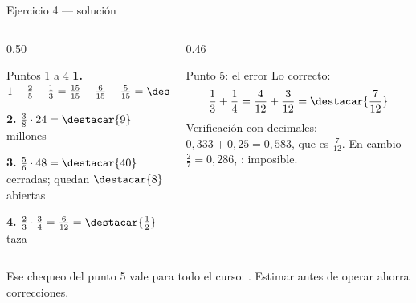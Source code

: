 \documentclass[aspectratio=169,10pt]{beamer}
\begin{document}
\begin{frame}{Ejercicio 4 — solución}
  \scriptsize
  \begin{columns}[T,onlytextwidth]
    \begin{column}{0.50\textwidth}
      \begin{block}{Puntos 1 a 4}
        \tiny
        \textbf{1.} $1 - \tfrac{2}{5} - \tfrac{1}{3}
        = \tfrac{15}{15}-\tfrac{6}{15}-\tfrac{5}{15}
        = \destacar{\tfrac{4}{15}}$

        \vspace{0.08cm}
        \textbf{2.} $\tfrac{3}{8}\cdot 24 = \destacar{9}$ millones

        \vspace{0.08cm}
        \textbf{3.} $\tfrac{5}{6}\cdot 48 = \destacar{40}$ cerradas;
        quedan $\destacar{8}$ abiertas

        \vspace{0.08cm}
        \textbf{4.} $\tfrac{2}{3}\cdot\tfrac{3}{4} = \tfrac{6}{12}
        = \destacar{\tfrac{1}{2}}$ taza
      \end{block}
    \end{column}
    \begin{column}{0.46\textwidth}
      \begin{alertblock}{Punto 5: el error}
        \tiny
         Lo correcto:
        \[ \frac{1}{3}+\frac{1}{4} = \frac{4}{12}+\frac{3}{12}
           = \destacar{\frac{7}{12}} \]
        Verificación con decimales: $0{,}333 + 0{,}25 = 0{,}583$, que es
        $\tfrac{7}{12}$. En cambio $\tfrac{2}{7} = 0{,}286$, : imposible.
      \end{alertblock}
    \end{column}
  \end{columns}

  \vspace{0.05cm}
  {\tiny\color{uniGris} Ese chequeo del punto 5 vale para todo el curso:
  . Estimar antes de operar ahorra correcciones.}
\end{frame}
\end{document}
